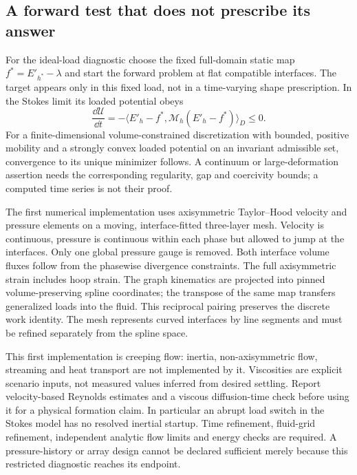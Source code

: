 \subsection{A forward test that does not prescribe its answer}
For the ideal-load diagnostic choose the fixed full-domain static map
$f^*=E'_{h^*}-\lambda$ and start the forward problem at flat compatible
interfaces. The target appears only in this fixed load, not in a time-varying
shape prescription. In the Stokes limit its loaded potential obeys
\[
 \frac{\dd\mathcal U}{\dd t}
 =-\langle E'_h-f^*,\mathcal M_h(E'_h-f^*)\rangle_D\leq0.
\]
For a finite-dimensional volume-constrained discretization with bounded,
positive mobility and a strongly convex loaded potential on an invariant
admissible set, convergence to its unique minimizer follows. A continuum or
large-deformation assertion needs the corresponding regularity, gap and
coercivity bounds; a computed time series is not their proof.

The first numerical implementation uses axisymmetric Taylor--Hood velocity
and pressure elements on a moving, interface-fitted three-layer mesh. Velocity
is continuous, pressure is continuous within each phase but allowed to jump
at the interfaces. Only one global pressure gauge is removed. Both interface
volume fluxes follow from the phasewise divergence constraints. The full
axisymmetric strain includes hoop strain. The graph kinematics are projected
into pinned volume-preserving spline coordinates; the transpose of the same
map transfers generalized loads into the fluid. This reciprocal pairing
preserves the discrete work identity. The mesh represents curved interfaces
by line segments and must be refined separately from the spline space.

This first implementation is creeping flow: inertia, non-axisymmetric flow,
streaming and heat transport are not implemented by it. Viscosities are
explicit scenario inputs, not measured values inferred from desired settling.
Report velocity-based Reynolds estimates and a viscous diffusion-time check
before using it for a physical formation claim. In particular an abrupt load
switch in the Stokes model has no resolved inertial startup. Time refinement,
fluid-grid refinement, independent analytic flow limits and energy checks are
required. A pressure-history or array design cannot be declared sufficient
merely because this restricted diagnostic reaches its endpoint.
